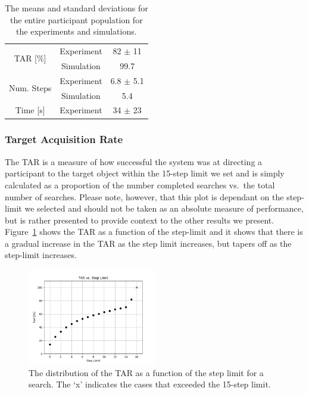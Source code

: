 \documentclass[a4paper, twoside]{article}
\begin{document}
\begin{table}                      
  \centering                       
  \caption{The means and standard deviations for the entire participant population for the experiments and simulations.}\label{tab:results-summary}
  \begin{tabular}{ccc}
    \toprule
    \multirow{2}{*}{TAR [\%]} & Experiment & 82 $\pm$ 11  \\ 
			      & Simulation & 99.7 \\ \midrule
    \multirow{2}{*}{Num. Steps} & Experiment & 6.8 $\pm$ 5.1 \\ 
			        & Simulation & 5.4 \\ \midrule
    Time [s] & Experiment & 34 $\pm$ 23  \\ \midrule
    \bottomrule
  \end{tabular}
\end{table}

\subsubsection{Target Acquisition Rate}

\noindent The TAR is a measure of how successful the system was at directing a participant to the target object within the 15-step limit we set and is simply calculated as a proportion of the number completed searches vs.\ the total number of searches. Please note, however, that this plot is dependant on the step-limit we selected and should not be taken as an absolute measure of performance, but is rather presented to provide context to the other results we present. Figure~\ref{fig:tar-steps} shows the TAR as a function of the step-limit and it shows that there is a gradual increase in the TAR as the step limit increases, but tapers off as the step-limit increases.

\begin{figure}
  \centering
  \includegraphics[width=0.5\textwidth]{../figures/cdf_tar_limit.png}
  \caption{The distribution of the TAR as a function of the step limit for a search. The `x' indicates the cases that exceeded the 15-step limit. }\label{fig:tar-steps}
\end{figure}
\end{document}
